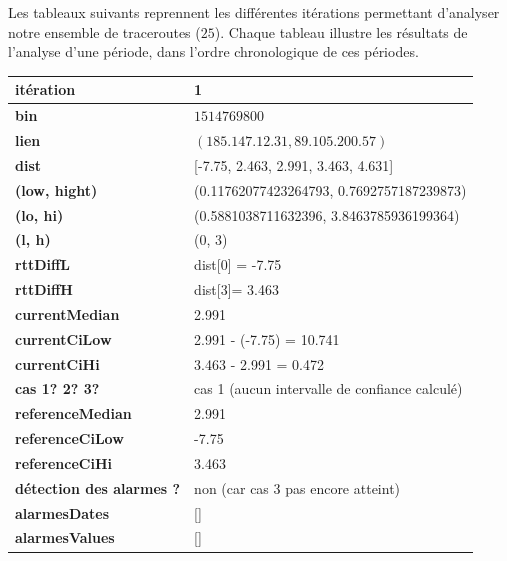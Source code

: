 Les tableaux suivants reprennent les différentes itérations permettant d'analyser notre ensemble de traceroutes ($25$). Chaque tableau illustre les résultats de l'analyse d'une période, dans l'ordre chronologique de ces périodes.
\newpage
\begin{table}[H]
	\centering
	
	\begin{tabularx}{\linewidth}{|l|X| }
		\hline
		\textbf{itération} & 1	\\ \hline
		\textbf{bin} & $1514769800$ \\ \hline
		\textbf{lien} & $(185.147.12.31, 89.105.200.57)$  \\ \hline
		\textbf{dist}& [-7.75, 2.463, 2.991, 3.463, 4.631]	\\ \hline
		\textbf{(low, hight)}& (0.11762077423264793, 0.7692757187239873) 	\\ \hline
		\textbf{(lo, hi)}&(0.5881038711632396, 3.8463785936199364)  \\ \hline
		\textbf{(l, h)} & (0, 3) 	\\ \hline
		\textbf{rttDiffL}& dist[0] = -7.75	\\ \hline
		\textbf{rttDiffH}& dist[3]= 3.463	\\ \hline
		\textbf{currentMedian}& 2.991	\\ \hline
		\textbf{currentCiLow}&  2.991 - (-7.75) = 10.741 	\\ \hline
		\textbf{currentCiHi}& 3.463 - 2.991 =  0.472	\\ \hline
		\textbf{cas 1? 2? 3?}& cas 1 (aucun intervalle de confiance calculé)  \\ \hline
		\textbf{referenceMedian}& 2.991	\\ \hline
		\textbf{referenceCiLow}& -7.75	\\ \hline
		\textbf{referenceCiHi}&3.463	\\ \hline
		\textbf{détection des alarmes ?}& non (car cas 3 pas  encore atteint)	\\ \hline
		\textbf{alarmesDates}& []	\\ \hline
		\textbf{alarmesValues}& []	\\ \hline
		
		
	\end{tabularx}
\end{table}



